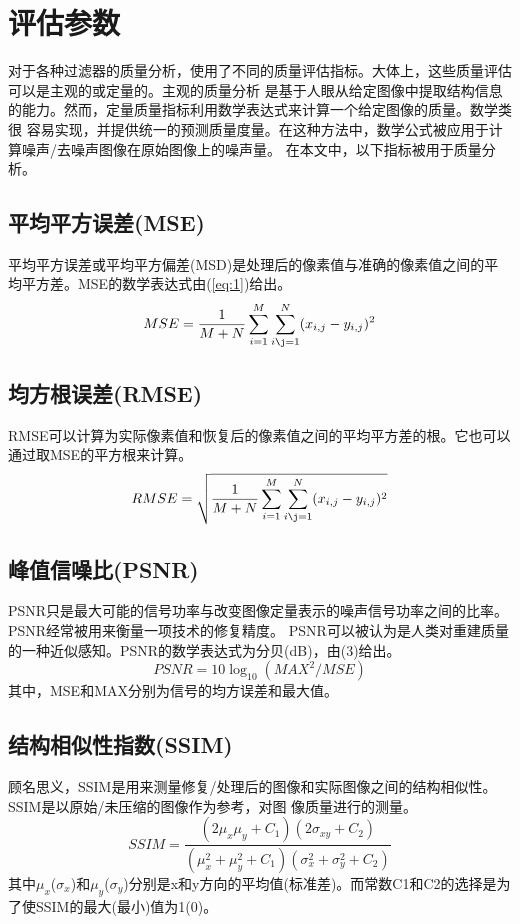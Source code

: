 \documentclass[12pt]{article} %
\begin{document}
\section{评估参数}
对于各种过滤器的质量分析，使用了不同的质量评估指标。大体上，这些质量评估可以是主观的或定量的。主观的质量分析
是基于人眼从给定图像中提取结构信息的能力。然而，定量质量指标利用数学表达式来计算一个给定图像的质量。数学类很
容易实现，并提供统一的预测质量度量。在这种方法中，数学公式被应用于计算噪声/去噪声图像在原始图像上的噪声量。
在本文中，以下指标被用于质量分析。

\subsection{平均平方误差(MSE)}
平均平方误差或平均平方偏差(MSD)是处理后的像素值与准确的像素值之间的平均平方差。MSE的数学表达式由(\ref{eq:1})给出。
\begin{equation}
    MSE= \frac{1}{M+N}\sum_{i=1}^M\sum_{i\j=1}^N(x_{i,j}-y_{i,j})^2
    \label{eq:1}
\end{equation}

\subsection{均方根误差(RMSE)}
RMSE可以计算为实际像素值和恢复后的像素值之间的平均平方差的根。它也可以通过取MSE的平方根来计算。
\begin{equation}
    RMSE=\sqrt{\frac{1}{M+N}\sum_{i=1}^M\sum_{i\j=1}^N(x_{i,j}-y_{i,j})^2}
\end{equation}

\subsection{峰值信噪比(PSNR)}
PSNR只是最大可能的信号功率与改变图像定量表示的噪声信号功率之间的比率。PSNR经常被用来衡量一项技术的修复精度。
PSNR可以被认为是人类对重建质量的一种近似感知。PSNR的数学表达式为分贝(dB)，由(3)给出。
\begin{equation}
    PSNR=10\log_{10}({MAX^2}/{MSE})
\end{equation}
其中，MSE和MAX分别为信号的均方误差和最大值。

\subsection{结构相似性指数(SSIM)}
顾名思义，SSIM是用来测量修复/处理后的图像和实际图像之间的结构相似性。SSIM是以原始/未压缩的图像作为参考，对图
像质量进行的测量。
\begin{equation}
    SSIM=\frac{(2\mu_x\mu_y+C_1)(2\sigma_{xy}+C_2)}{(\mu_x^2+\mu_y^2+C_1)(\sigma_x^2+\sigma_y^2+C_2)}
\end{equation}
其中$\mu_x$($\sigma_x$)和$\mu_y$($\sigma_y$)分别是x和y方向的平均值(标准差)。而常数C1和C2的选择是为了使SSIM的最大(最小)值为1(0)。
\end{document}
